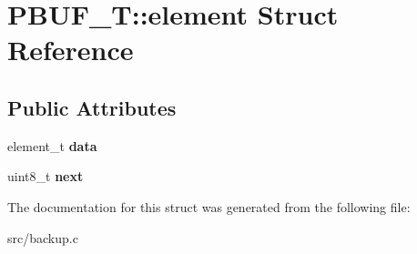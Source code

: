 \hypertarget{structPBUF__T_1_1element}{}\section{P\+B\+U\+F\+\_\+T\+:\+:element Struct Reference}
\label{structPBUF__T_1_1element}
\subsection*{Public Attributes}
\begin{DoxyCompactItemize}
\item 
\mbox{\label{structPBUF__T_1_1element_ad9aedd2924247673e0ca39d0c42685ca}} 
element\+\_\+t {\bfseries data}
\item 
\mbox{\label{structPBUF__T_1_1element_aeb8ddd6e9729823e67c815d4812fed53}} 
uint8\+\_\+t {\bfseries next}
\end{DoxyCompactItemize}


The documentation for this struct was generated from the following file\+:\begin{DoxyCompactItemize}
\item 
src/backup.\+c\end{DoxyCompactItemize}
